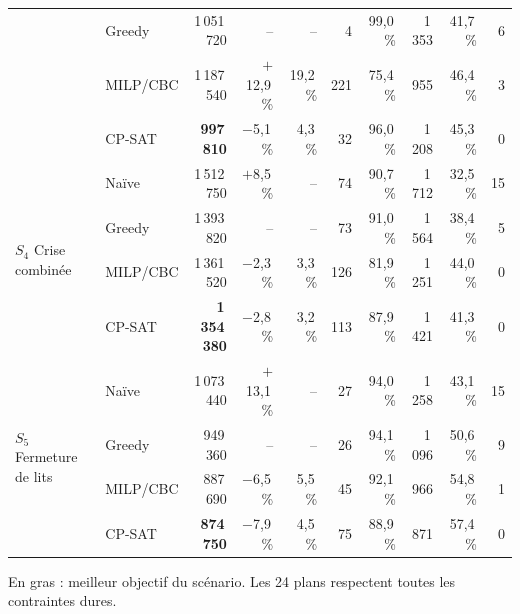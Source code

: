 \begin{table}[H]
{\begin{tabular}{llrrrrrrrr}
         & Greedy & 1\,051\,720 & -- & -- & 4 & 99{,}0\,\% & 1\,353 & 41{,}7\,\% & 6 \\
         & MILP/CBC & 1\,187\,540 & $+$12{,}9\,\% & 19{,}2\,\% & 221 & 75{,}4\,\% & 955 & 46{,}4\,\% & 3 \\
         & CP-SAT & \textbf{997\,810} & $-$5{,}1\,\% & 4{,}3\,\% & 32 & 96{,}0\,\% & 1\,208 & 45{,}3\,\% & 0 \\
        \midrule
        \multirow{4}{*}{$S_4$ Crise combinée} & Naïve & 1\,512\,750 & $+$8{,}5\,\% & -- & 74 & 90{,}7\,\% & 1\,712 & 32{,}5\,\% & 15 \\
         & Greedy & 1\,393\,820 & -- & -- & 73 & 91{,}0\,\% & 1\,564 & 38{,}4\,\% & 5 \\
         & MILP/CBC & 1\,361\,520 & $-$2{,}3\,\% & 3{,}3\,\% & 126 & 81{,}9\,\% & 1\,251 & 44{,}0\,\% & 0 \\
         & CP-SAT & \textbf{1\,354\,380} & $-$2{,}8\,\% & 3{,}2\,\% & 113 & 87{,}9\,\% & 1\,421 & 41{,}3\,\% & 0 \\
        \midrule
        \multirow{4}{*}{$S_5$ Fermeture de lits} & Naïve & 1\,073\,440 & $+$13{,}1\,\% & -- & 27 & 94{,}0\,\% & 1\,258 & 43{,}1\,\% & 15 \\
         & Greedy & 949\,360 & -- & -- & 26 & 94{,}1\,\% & 1\,096 & 50{,}6\,\% & 9 \\
         & MILP/CBC & 887\,690 & $-$6{,}5\,\% & 5{,}5\,\% & 45 & 92{,}1\,\% & 966 & 54{,}8\,\% & 1 \\
         & CP-SAT & \textbf{874\,750} & $-$7{,}9\,\% & 4{,}5\,\% & 75 & 88{,}9\,\% & 871 & 57{,}4\,\% & 0 \\
        \bottomrule
    \end{tabular}}
    \par\vspace{3pt}
    {\footnotesize En gras : meilleur objectif du scénario. Les 24 plans respectent toutes les contraintes dures.}
\end{table}

